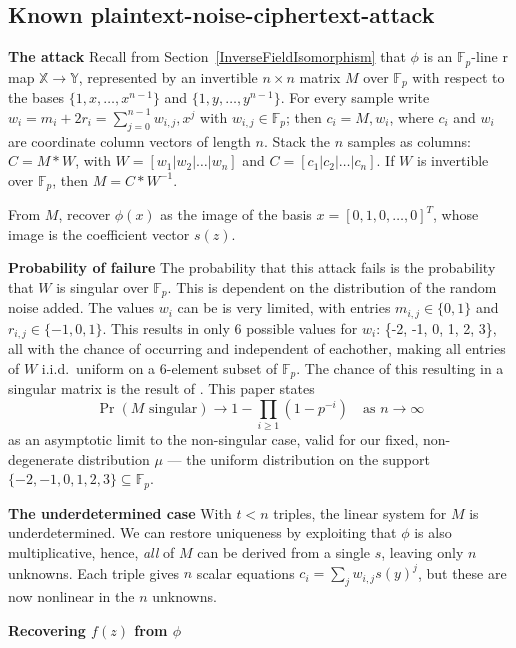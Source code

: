 \documentclass{article}
\begin{document}
\subsection{Known plaintext-noise-ciphertext-attack}
\textbf{The attack}
Recall from Section~\ref{InverseFieldIsomorphism} that $\phi$ is an $\mathbb{F}_p$-line r map $\mathbb{X} \rightarrow \mathbb{Y}$, represented by an invertible $n \times n$ matrix $M$ over $\mathbb{F}_p$ with respect to the bases $\{1, x, \dots, x^{n-1}\}$ and $\{1, y, \dots, y^{n-1}\}$. For every sample write $w_i = m_i + 2r_i = \sum_{j=0}^{n-1} w_{i,j},x^j$ with $w_{i,j}\in\mathbb{F}_p$; then $c_i = M,w_i$, where $c_i$ and $w_i$ are coordinate column vectors of length $n$. Stack the $n$ samples as columns: $C = M * W$, with $W = [w_1 | w_2 | \dots | w_n]$ and $C = [c_1 | c_2 | \dots | c_n]$. If $W$ is invertible over $\mathbb{F}_p$, then $M = C * W^{-1}$.

From $M$, recover $\phi(x)$ as the image of the basis $x = [0, 1, 0, \dots, 0]^T$, whose image is the coefficient vector $s(z)$.

\textbf{Probability of failure}
The probability that this attack fails is the probability that $W$ is singular over $\mathbb{F}_p$. This is dependent on the distribution of the random noise added. The values $w_i$ can be is very limited, with entries $m_{i,j} \in \{0, 1\}$ and $r_{i,j} \in \{-1, 0,  1\}$. This results in only 6 possible values for $w_i$: \{-2, -1, 0, 1, 2, 3\}, all with the chance of occurring and independent of eachother, making all entries of $W$ i.i.d.~uniform on a 6-element subset of $\mathbb{F}_p$. The chance of this resulting in a singular matrix is the result of \textcite{kahn-2001}. This paper states
\[
  \Pr(M \text{ singular}) \rightarrow 1 - \prod_{i \ge 1}\left(1-p^{-i}\right)
  \quad \text{as } n \rightarrow \infty
\]
as an asymptotic limit to the non-singular case, valid for our fixed, non-degenerate distribution $\mu$ --- the uniform distribution on the support $\{-2, -1, 0, 1, 2, 3\} \subseteq \mathbb{F}_p$.

\textbf{The underdetermined case}
With $t < n$ triples, the linear system for $M$ is underdetermined. We can restore uniqueness by exploiting that $\phi$ is also multiplicative, hence, \emph{all} of $M$ can be derived from a single $s$, leaving only $n$ unknowns. Each triple gives $n$ scalar equations $c_i = \sum_j w_{i,j} s(y)^j$, but these are now nonlinear in the $n$ unknowns.

\textbf{Recovering $f(z)$ from $\phi$}
\end{document}
